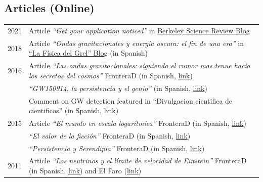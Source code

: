 \documentclass[11pt,a4paper]{article}
\begin{document}
\subsection*{Articles (Online)}
\vspace{-.3cm}
\begin{longtable}{c p{15cm}}
2021 & {Article} \textit{``Get your application noticed''} in \href{https://www.berkeleysciencereview.com/article/2021/05/22/get-your-application-noticed}{Berkeley Science Review Blog} %
\\[2pt]
2018 & {Article} \textit{``Ondas gravitacionales y energ\'ia oscura: el fin de una era''} in \href{https://lafisicadelgrel.blogspot.com/2018/06/ondas-gravitacionales-y-energia-oscura.html}{``La F\'isica del Grel'' Blog} %
(in Spanish)  \\[2pt]
2016
& {Article} {\it ``Las ondas gravitacionales: siguiendo el rumor mas tenue hacia los secretos del cosmos''} FronteraD
(in Spanish, \href{https://www.fronterad.com/las-ondas-gravitacionales-siguiendo-el-rumor-mas-tenue-hacia-los-secretos-del-cosmos/}{link})
\\[2pt]
& {\it ``GW150914, la persistencia y el genio''} (in Spanish, \href{https://www.fronterad.com/gw150914-la-persistencia-y-el-genio/}{link})\\[2pt]
& Comment on GW detection featured in ``Divulgacion cientifica de cientificos'' (in Spanish, \href{https://divulgacioncientificadecientificos.blogspot.com/2018/10/ondas-gravitacionales-miguel.html}{link})
\\[2pt]
2015
 &  {Article} {\it ``El mundo en escala logar\'itmica''}  FronteraD
(in Spanish,
\href{https://www.fronterad.com/pequeno-mapa-del-mundo-en-potencias-de-diez-i-contando-cifras/}{link}) %
\\[2pt]
 &  {\it ``El valor de la ficci\'on''}  FronteraD
(in Spanish,
\href{https://www.fronterad.com/el-valor-de-la-ficcion/}{link}) %
\\[2pt]
 &  {\it ``Persistencia y Serendipia''}  FronteraD
(in Spanish,
\href{https://www.fronterad.com/persistencia-y-serendipia/}{link}) %
\\[2pt]
2011 & {Article} {\it ``Los neutrinos y el l\'imite de velocidad de Einstein''} %
FronteraD (in Spanish, \href{https://www.fronterad.com/los-neutrinos-y-el-limite-de-velocidad-de-einstein/}{link})  and El Faro (\href{https://www.elfaro.net/es/201110/el_agora/6219/}{link}) 
\end{longtable}
\end{document}
